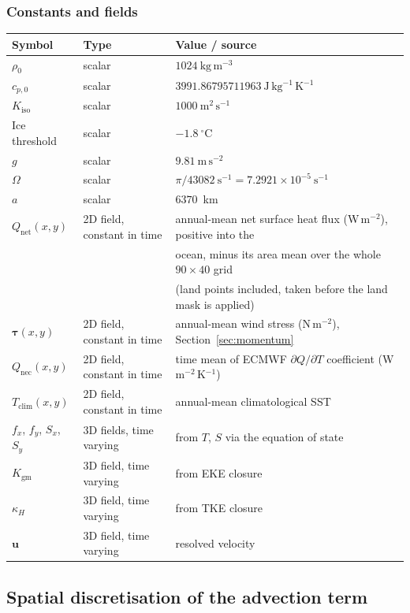 \documentclass{article}
\begin{document}
\subsubsection*{Constants and fields}
\begin{center}
\small
\begin{tabular}{lll}
\hline
Symbol & Type & Value / source \\
\hline
$\rho_0$ & scalar & $1024~\text{kg}\,\text{m}^{-3}$ \\
$c_{p,0}$ & scalar & $3991.86795711963~\text{J}\,\text{kg}^{-1}\,\text{K}^{-1}$ \\
$K_\text{iso}$ & scalar & $1000~\text{m}^2\,\text{s}^{-1}$ \\
Ice threshold & scalar & $-1.8~^\circ$C \\
$g$ & scalar & $9.81~\text{m}\,\text{s}^{-2}$ \\
$\Omega$ & scalar & $\pi/43082~\text{s}^{-1} = 7.2921\times10^{-5}~\text{s}^{-1}$ \\
$a$ & scalar & $6370$~km \\
$Q_\text{net}(x,y)$ & 2D field, constant in time & annual-mean net surface heat flux (W\,m$^{-2}$), positive into the \\
 & & ocean, minus its area mean over the whole $90\times40$ grid \\
 & & (land points included, taken before the land mask is applied) \\
$\boldsymbol\tau(x,y)$ & 2D field, constant in time & annual-mean wind stress (N\,m$^{-2}$), Section~\ref{sec:momentum} \\
$Q_\text{nec}(x,y)$ & 2D field, constant in time & time mean of ECMWF $\partial Q/\partial T$ coefficient (W\,m$^{-2}$\,K$^{-1}$) \\
$T_\text{clim}(x,y)$ & 2D field, constant in time & annual-mean climatological SST \\
$f_x$, $f_y$, $S_x$, $S_y$ & 3D fields, time varying & from $T$, $S$ via the equation of state \\
$K_\text{gm}$ & 3D field, time varying & from EKE closure \\
$\kappa_H$ & 3D field, time varying & from TKE closure \\
$\mathbf{u}$ & 3D field, time varying & resolved velocity \\
\hline
\end{tabular}
\end{center}

\subsection{Spatial discretisation of the advection term}\label{sec:advection}
\end{document}
